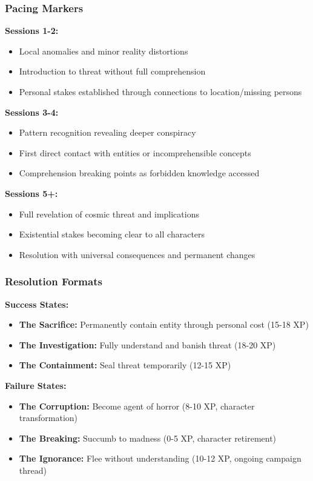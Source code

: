 \documentclass[11pt]{article}
\begin{document}
\subsubsection{Pacing Markers}

\textbf{Sessions 1-2:}
\begin{itemize}
\item Local anomalies and minor reality distortions
\item Introduction to threat without full comprehension
\item Personal stakes established through connections to location/missing persons
\end{itemize}

\textbf{Sessions 3-4:}
\begin{itemize}
\item Pattern recognition revealing deeper conspiracy
\item First direct contact with entities or incomprehensible concepts
\item Comprehension breaking points as forbidden knowledge accessed
\end{itemize}

\textbf{Sessions 5+:}
\begin{itemize}
\item Full revelation of cosmic threat and implications
\item Existential stakes becoming clear to all characters
\item Resolution with universal consequences and permanent changes
\end{itemize}

\subsubsection{Resolution Formats}

\textbf{Success States:}
\begin{itemize}
\item \textbf{The Sacrifice:} Permanently contain entity through personal cost (15-18 XP)
\item \textbf{The Investigation:} Fully understand and banish threat (18-20 XP)
\item \textbf{The Containment:} Seal threat temporarily (12-15 XP)
\end{itemize}

\textbf{Failure States:}
\begin{itemize}
\item \textbf{The Corruption:} Become agent of horror (8-10 XP, character transformation)
\item \textbf{The Breaking:} Succumb to madness (0-5 XP, character retirement)
\item \textbf{The Ignorance:} Flee without understanding (10-12 XP, ongoing campaign thread)
\end{itemize}
\end{document}
